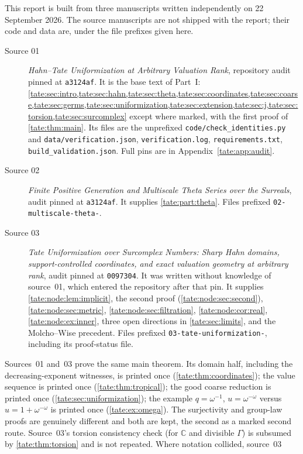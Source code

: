 \documentclass[11pt,letterpaper]{article}
\theoremstyle{definition}
\newcommand{\C}{\mathbb C}
\newcommand{\file}[1]{\nolinkurl{#1}}
\begin{document}
This report is built from three manuscripts written independently on
22 September 2026. The source manuscripts are not shipped with the report;
their code and data are, under the file prefixes given here.
\begin{description}
\item[Source 01] \emph{Hahn--Tate Uniformization at Arbitrary Valuation
Rank}, repository audit pinned at \texttt{a3124af}. It is the base text
of Part~I:
\cref{tate:sec:intro,tate:sec:hahn,tate:sec:theta,tate:sec:coordinates,tate:sec:coarse,tate:sec:germs,tate:sec:uniformization,tate:sec:extension,tate:sec:j,tate:sec:torsion,tate:sec:surcomplex}
except where marked, with the first proof of \cref{tate:thm:main}. Its
files are the unprefixed \file{code/check_identities.py} and
\file{data/verification.json}, \file{verification.log},
\file{requirements.txt}, \file{build_validation.json}. Full pins are in
Appendix~\ref{tate:app:audit}.
\item[Source 02] \emph{Finite Positive Generation and Multiscale Theta
Series over the Surreals}, audit pinned at \texttt{a3124af}. It supplies
\cref{tate:part:theta}. Files prefixed \file{02-multiscale-theta-}.
\item[Source 03] \emph{Tate Uniformization over Surcomplex Numbers: Sharp
Hahn domains, support-controlled coordinates, and exact valuation geometry
at arbitrary rank}, audit pinned at \texttt{0097304}. It was written without
knowledge of source~01, which entered the repository after that pin. It
supplies \cref{tate:node:lem:implicit}, the second proof
(\cref{tate:node:sec:second}), \cref{tate:node:sec:metric},
\cref{tate:node:sec:filtration}, \cref{tate:node:cor:real},
\cref{tate:node:ex:inner}, three open directions in \cref{tate:sec:limits},
and the Molcho--Wise precedent. Files prefixed
\file{03-tate-uniformization-}, including its proof-status file.
\end{description}
Sources~01 and~03 prove the same main theorem. Its domain half, including
the decreasing-exponent witnesses, is printed once
(\cref{tate:thm:coordinates}); the value sequence is printed once
(\cref{tate:thm:tropical}); the good coarse reduction is printed once
(\cref{tate:sec:uniformization}); the example $q=\omega^{-1}$,
$u=\omega^{-\omega}$ versus $u=1+\omega^{-\omega}$ is printed once
(\cref{tate:ex:omega}). The surjectivity and group-law proofs are genuinely
different and both are kept, the second as a marked second route. Source~03's
torsion consistency check (for $\C$ and divisible $\Gamma$) is subsumed by
\cref{tate:thm:torsion} and is not repeated. Where notation collided, source~03
\end{document}
